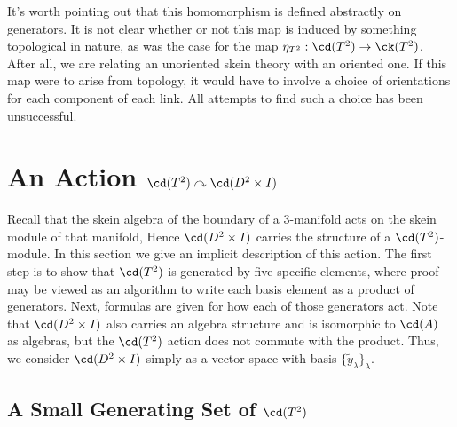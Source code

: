 \begin{remark}
It's worth pointing out that this homomorphism is defined abstractly on generators. It is not clear whether or not this map is induced by something topological in nature, as was the case for the map $\eta_{T^2}: \cd(T^2) \to \ck(T^2)$. After all, we are relating an unoriented skein theory with an oriented one. If this map were to arise from topology, it would have to involve a choice of orientations for each component of each link. All attempts to find such a choice has been unsuccessful.
\end{remark}


\section{An Action $\cd(T^2) \curvearrowright \cd(D^2 \times I)$}

Recall that the skein algebra of the boundary of a 3-manifold acts on the skein module of that manifold, Hence $\cd(D^2 \times I)$ carries the structure of a $\cd(T^2)$-module. In this section we give an implicit description of this action. The first step is to show that $\cd(T^2)$ is generated by five specific elements, where proof may be viewed as an algorithm to write each basis element as a product of generators. Next, formulas are given for how each of those generators act. Note that $\cd(D^2 \times I)$ also carries an algebra structure and is isomorphic to $\cd(A)$ as algebras, but the $\cd(T^2)$ action does not commute with the product. Thus, we consider $\cd(D^2 \times I)$ simply as a vector space with basis $\{\tilde{y}_\lambda \}_\lambda$.






\subsection{A Small Generating Set of $\cd(T^2)$} \label{sec:generators}

